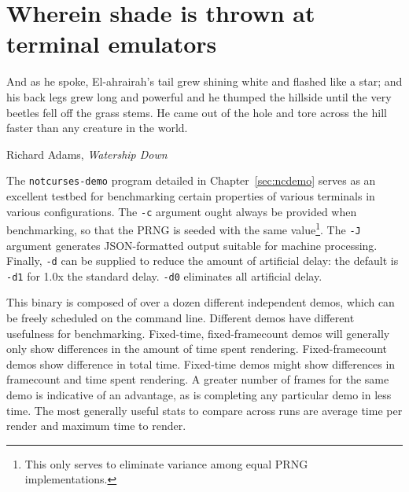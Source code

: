 \section{Wherein shade is thrown at terminal emulators}
\label{sec:termshade}
\epigraph{And as he spoke, El-ahrairah's tail grew shining white and flashed like a star;
and his back legs grew long and powerful and he thumped the hillside until the
very beetles fell off the grass stems. He came out of the hole and tore across
the hill faster than any creature in the world.}{Richard Adams, \textit{Watership Down}}
The \texttt{notcurses-demo} program detailed in Chapter~\ref{sec:ncdemo} serves
as an excellent testbed for benchmarking certain properties of various
terminals in various configurations. The \texttt{-c} argument ought always be
provided when benchmarking, so that the PRNG is seeded with the same
value\footnote{This only serves to eliminate variance among equal PRNG
implementations.}. The \texttt{-J} argument generates JSON-formatted
output suitable for machine processing. Finally, \texttt{-d} can be supplied
to reduce the amount of artificial delay: the default is \texttt{-d1} for 1.0x
the standard delay. \texttt{-d0} eliminates all artificial delay.

This binary is composed of over a dozen
different independent demos, which can be freely scheduled on the command line.
Different demos have different usefulness for benchmarking. Fixed-time, fixed-framecount
demos will generally only show differences in the amount of time spent
rendering. Fixed-framecount demos show difference in total time. Fixed-time demos
might show differences in framecount and time spent rendering. A greater
number of frames for the same demo is indicative of an advantage, as is completing
any particular demo in less time. The most generally useful stats to compare
across runs are average time per render and maximum time to render.

